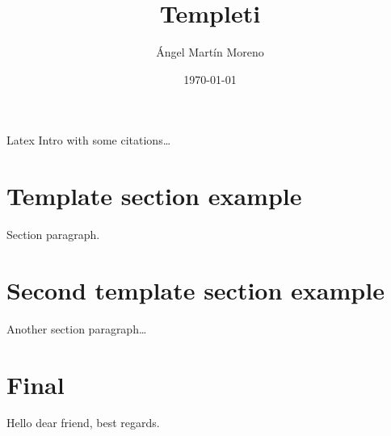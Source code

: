 \documentclass[letterpaper, 10pt]{article}
\title{Templeti}
\author{Ángel Martín Moreno}
\date{\today}
\begin{document}
\maketitle

Latex \cite{latexcompanion} Intro with some citations\ldots

\section{Template section example}
Section paragraph.

\section{Second template section example}
Another section paragraph\ldots

\section{Final}
Hello dear friend, best regards.

\printbibliography

\clearpage
\tableofcontents
{}
\end{document}
